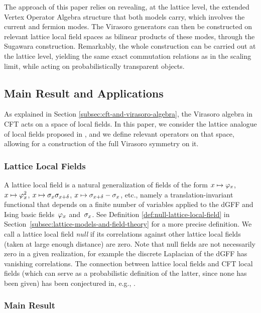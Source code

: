 \documentclass[12pt,oneside,english]{amsart}
\numberwithin{equation}{section}
\numberwithin{figure}{section}
\theoremstyle{plain}
\theoremstyle{plain}
\theoremstyle{plain}
\theoremstyle{plain}
\theoremstyle{remark}
\theoremstyle{definition}
\theoremstyle{plain}
\theoremstyle{plain}
\numberwithin{thm}{section}
\begin{document}
The approach of this paper relies on revealing, at the lattice level,
the extended Vertex Operator Algebra structure that both models carry,
which involves the current and fermion modes. The Virasoro generators
can then be constructed on relevant lattice local field spaces as
bilinear products of these modes, through the Sugawara construction.
Remarkably, the whole construction can be carried out at the lattice
level, yielding the same exact commutation relations as in the scaling
limit, %
while acting on probabilistically transparent objects.

\subsection{Main Result and Applications}

As explained in Section \ref{subsec:cft-and-virasoro-algebra}, the
Virasoro algebra in CFT acts on a space of local fields. In this paper,
we consider the lattice analogue of local fields proposed in 
\cite{gheissari-hongler-park},
and we define relevant operators on that space, allowing for a construction
of the full Virasoro symmetry on it.

\subsubsection{Lattice Local Fields}

A lattice local field is a natural generalization of fields of the
form $x\mapsto{\varphi}_{x}$, $x\mapsto{\varphi}_{x}^{2}$, 
$x\mapsto{\sigma}_{x}{\sigma}_{x+{\delta}}$,
$x\mapsto{\sigma}_{x+{\delta}}-{\sigma}_{x}$, etc., namely a 
translation-invariant
functional that depends on a finite number of variables applied to
the dGFF and Ising basic fields~${\varphi}_{x}$ and~${\sigma}_{x}$.
See Definition \ref{def:null-lattice-local-field} in 
Section~\ref{subsec:lattice-models-and-field-theory}
for a more precise definition. We call a lattice local field \emph{null}
if its correlations against other lattice local fields (taken at large
enough distance) are zero. Note that null fields are not necessarily
zero in a given realization, for example the discrete Laplacian of
the dGFF has vanishing correlations. The connection between lattice
local fields and CFT local fields (which can serve as a probabilistic
definition of the latter, since none has been given) has been conjectured
in, e.g., \cite{gheissari-hongler-park}.

\subsubsection{Main Result}
\end{document}
